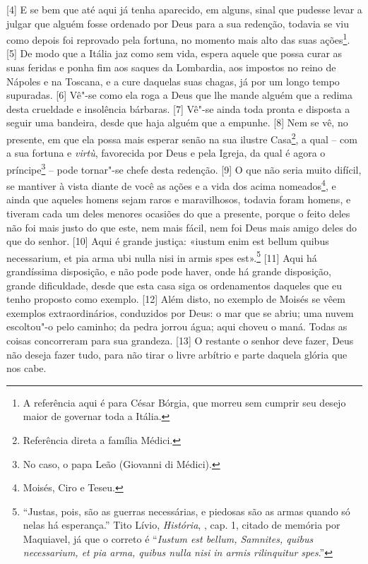 {[}4{]} E se bem que até aqui já tenha aparecido, em alguns, sinal que
pudesse levar a julgar que alguém fosse ordenado por Deus para a sua
redenção, todavia se viu como depois foi reprovado pela fortuna, no
momento mais alto das suas ações\footnote{A referência aqui é para César
  Bórgia, que morreu sem cumprir seu desejo maior de governar toda a
  Itália.}. {[}5{]} De modo que a Itália jaz como sem vida, espera
aquele que possa curar as suas feridas e ponha fim aos saques da
Lombardia, aos impostos no reino de Nápoles e na Toscana, e a cure
daquelas suas chagas, já por um longo tempo supuradas. {[}6{]} Vê"-se
como ela roga a Deus que lhe mande alguém que a redima desta crueldade e
insolência bárbaras. {[}7{]} Vê"-se ainda toda pronta e disposta a seguir
uma bandeira, desde que haja alguém que a empunhe. {[}8{]} Nem se vê, no
presente, em que ela possa mais esperar senão na sua ilustre
Casa\footnote{Referência direta a família Médici.}, a qual -- com a sua
fortuna e \emph{virtù}, favorecida por Deus e pela Igreja, da qual é
agora o príncipe\footnote{No caso, o papa Leão  (Giovanni di Médici).}
-- pode tornar"-se chefe desta redenção. {[}9{]} O que não seria muito
difícil, se mantiver à vista diante de você as ações e a vida dos acima
nomeados\footnote{Moisés, Ciro e Teseu.}, e ainda que aqueles homens
sejam raros e maravilhosos, todavia foram homens, e tiveram cada um
deles menores ocasiões do que a presente, porque o feito deles não foi
mais justo do que este, nem mais fácil, nem foi Deus mais amigo deles do
que do senhor. {[}10{]} Aqui é grande justiça: «iustum enim est bellum
quibus necessarium, et pia arma ubi nulla nisi in armis spes
est».\footnote{``Justas, pois, são as guerras necessárias, e piedosas
  são as armas quando só nelas há esperança.'' Tito Lívio,
  \emph{História}, , cap. 1, citado de memória por Maquiavel, já
  que o correto é ``\emph{Iustum est bellum, Samnites, quibus
  necessarium, et pia arma, quibus nulla nisi in armis rilinquitur
  spes}.''} {[}11{]} Aqui há grandíssima disposição, e não pode pode
haver, onde há grande disposição, grande dificuldade, desde que esta
casa siga os ordenamentos daqueles que eu tenho proposto como exemplo.
{[}12{]} Além disto, no exemplo de Moisés se vêem exemplos
extraordinários, conduzidos por Deus: o mar que se abriu; uma nuvem
escoltou"-o pelo caminho; da pedra jorrou água; aqui choveu o maná. Todas
as coisas concorreram para sua grandeza. {[}13{]} O restante o senhor
deve fazer, Deus não deseja fazer tudo, para não tirar o livre arbítrio
e parte daquela glória que nos cabe.

